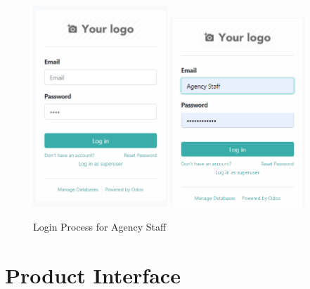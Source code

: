 \begin{figure}[h]
    \centering
    \includegraphics[width=0.45\textwidth]{sprint1/login.png}
    \hfill
    \includegraphics[width=0.45\textwidth]{sprint1/login2.png}
    \caption{Login Process for Agency Staff}
    \label{fig:login_process}
\end{figure}



\section{Product Interface}

